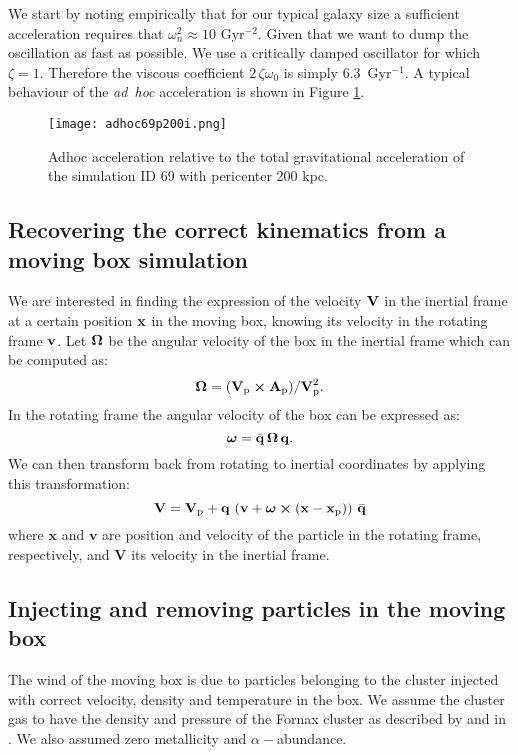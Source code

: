 We start by noting empirically that for our typical galaxy size a sufficient acceleration requires that $\omega_n^2\approx 10$ Gyr$^{-2}$.
Given that we want to dump the oscillation as fast as possible. We use a critically damped oscillator  for which $\zeta = 1$. Therefore the viscous coefficient $2\,\zeta\omega_0$ is simply $6.3$~Gyr$^{-1}$.
A typical behaviour of the \emph{ad~hoc} acceleration is shown in Figure \ref{fig:adhoc}.

\begin{figure}[ht]
\centering
  \texttt{[image: adhoc69p200i.png]}
\caption{Adhoc acceleration relative to the total gravitational acceleration of the simulation ID 69 with pericenter 200 kpc.}
\label{fig:adhoc}
\end{figure}


\subsection{Recovering the correct kinematics from a moving box simulation}
\label{sec:correct_kinematics}
We are interested in finding the expression of the velocity $\boldsymbol{\mathbf{V}}$ in the inertial frame at a certain position $\boldsymbol{\mathbf{x}}$ in the moving box, knowing its velocity in the rotating frame $\boldsymbol{\mathbf{v}}$.
Let $\boldsymbol{\mathbf{\Omega}}$ be the angular velocity of the box in the inertial frame which can be computed as:
\begin{equation}
 \boldsymbol{\mathbf{\Omega}} = {(\boldsymbol{\mathbf{V}}_{\mathrm p}\cross\boldsymbol{\mathbf{A}}_{\mathrm p})}/{\boldsymbol{\mathbf{V}}_{\mathrm p}^2}.
\end{equation}
In the rotating frame the angular velocity of the box can be expressed as:
\begin{equation}
\boldsymbol{\mathbf{\omega}} = \bar{\mathbf{q}}\, \boldsymbol{\mathbf{\Omega}}\, \mathbf{q}.
\end{equation}
We can then transform back from rotating to inertial coordinates by applying this transformation:
\begin{equation}
\boldsymbol{\mathbf{V}} = \boldsymbol{\mathbf{V}}_{\mathrm p} + \mathbf{q} \, \left(\boldsymbol{\mathbf{v}} + \boldsymbol{\mathbf{\omega}} \cross (\boldsymbol{\mathbf{x}}-\boldsymbol{\mathbf{x}}_{\mathrm p})\right) \,\bar{\mathbf{q}}
\end{equation}
where $\mathbf x$ and $\mathbf v$ are position and velocity of the particle in the rotating frame, respectively, and $\mathbf V$ its velocity in the inertial frame. %

\subsection{Injecting and removing particles in the moving box}
The wind of the moving box is due to particles belonging to the cluster injected with correct velocity, density and temperature in the box.
We assume the cluster gas to have the density and pressure of the Fornax cluster as described by \citet{Paolillo2002} and in . We also assumed zero metallicity and $\alpha-$abundance.

